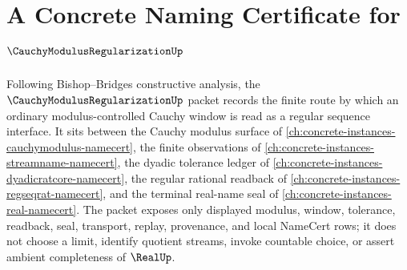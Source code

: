\chapter{A Concrete Naming Certificate for $\CauchyModulusRegularizationUp$}
\label{ch:concrete-instances-cauchy-modulus-regularization-namecert}

Following Bishop--Bridges constructive analysis, the $\CauchyModulusRegularizationUp$ packet records the finite route by which an ordinary modulus-controlled Cauchy window is read as a regular sequence interface. It sits between the Cauchy modulus surface of \autoref{ch:concrete-instances-cauchymodulus-namecert}, the finite observations of \autoref{ch:concrete-instances-streamname-namecert}, the dyadic tolerance ledger of \autoref{ch:concrete-instances-dyadicratcore-namecert}, the regular rational readback of \autoref{ch:concrete-instances-regseqrat-namecert}, and the terminal real-name seal of \autoref{ch:concrete-instances-real-namecert}. The packet exposes only displayed modulus, window, tolerance, readback, seal, transport, replay, provenance, and local NameCert rows; it does not choose a limit, identify quotient streams, invoke countable choice, or assert ambient completeness of $\RealUp$.

